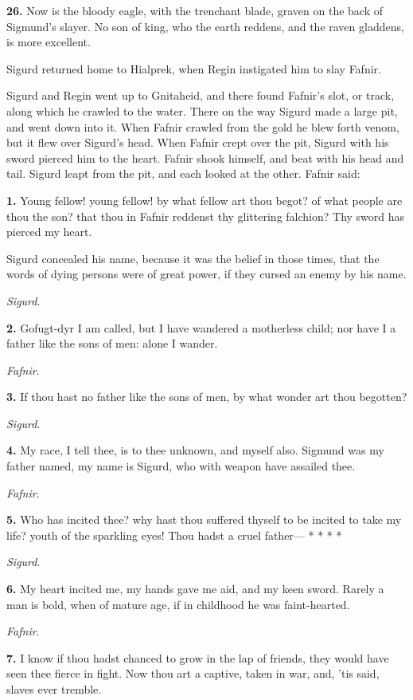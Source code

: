 \textbf{26.} Now is the bloody eagle, with the trenchant blade, graven on the
back of Sigmund's slayer. No son of king, who the earth reddens, and
the raven gladdens, is more excellent.

Sigurd returned home to Hialprek, when Regin instigated him to slay
Fafnir.


Sigurd and Regin went up to Gnitaheid, and there found Fafnir's slot,
or track, along which he crawled to the water. There on the way Sigurd
made a large pit, and went down into it. When Fafnir crawled from the
gold he blew forth venom, but it flew over Sigurd's head. When Fafnir
crept over the pit, Sigurd with his sword pierced him to the heart.
Fafnir shook himself, and beat with his head and tail. Sigurd leapt
from the pit, and each looked at the other. Fafnir said:

\textbf{1.} Young fellow! young fellow! by what fellow art thou begot? of
what people are thou the son? that thou in Fafnir reddenst thy
glittering falchion? Thy sword has pierced my heart.

Sigurd concealed his name, because it was the belief in those times,
that the words of dying persons were of great power, if they cursed an
enemy by his name.

\emph{Sigurd}.

\textbf{2.} Gofugt-dyr I am called, but I have wandered a motherless child;
nor have I a father like the sons of men: alone I wander.

\emph{Fafnir}.

\textbf{3.} If thou hast no father like the sons of men, by what wonder art
thou begotten?

\emph{Sigurd}.

\textbf{4.} My race, I tell thee, is to thee unknown, and myself also.
Sigmund was my father named, my name is Sigurd, who with weapon have
assailed thee.

\emph{Fafnir}.

\textbf{5.} Who has incited thee? why hast thou suffered thyself to be
incited to take my life? youth of the sparkling eyes! Thou hadst a
cruel father— * * * *

\emph{Sigurd}.

\textbf{6.} My heart incited me, my hands gave me aid, and my keen sword.
Rarely a man is bold, when of mature age, if in childhood he was
faint-hearted.

\emph{Fafnir}.

\textbf{7.} I know if thou hadst chanced to grow in the lap of friends, they
would have seen thee fierce in fight. Now thou art a captive, taken in
war, and, 'tis said, slaves ever tremble.

